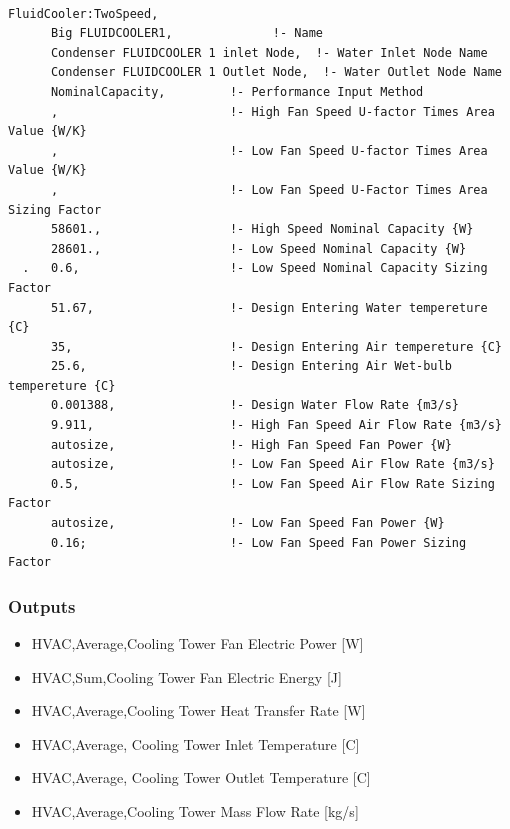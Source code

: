 \begin{lstlisting}

FluidCooler:TwoSpeed,
      Big FLUIDCOOLER1,              !- Name
      Condenser FLUIDCOOLER 1 inlet Node,  !- Water Inlet Node Name
      Condenser FLUIDCOOLER 1 Outlet Node,  !- Water Outlet Node Name
      NominalCapacity,         !- Performance Input Method
      ,                        !- High Fan Speed U-factor Times Area Value {W/K}
      ,                        !- Low Fan Speed U-factor Times Area Value {W/K}
      ,                        !- Low Fan Speed U-Factor Times Area Sizing Factor
      58601.,                  !- High Speed Nominal Capacity {W}
      28601.,                  !- Low Speed Nominal Capacity {W}
  .   0.6,                     !- Low Speed Nominal Capacity Sizing Factor
      51.67,                   !- Design Entering Water tempereture {C}
      35,                      !- Design Entering Air tempereture {C}
      25.6,                    !- Design Entering Air Wet-bulb tempereture {C}
      0.001388,                !- Design Water Flow Rate {m3/s}
      9.911,                   !- High Fan Speed Air Flow Rate {m3/s}
      autosize,                !- High Fan Speed Fan Power {W}
      autosize,                !- Low Fan Speed Air Flow Rate {m3/s}
      0.5,                     !- Low Fan Speed Air Flow Rate Sizing Factor
      autosize,                !- Low Fan Speed Fan Power {W}
      0.16;                    !- Low Fan Speed Fan Power Sizing Factor
\end{lstlisting}

\subsubsection{Outputs}\label{outputs-9-000}

\begin{itemize}
\item
  HVAC,Average,Cooling Tower Fan Electric Power {[}W{]}
\item
  HVAC,Sum,Cooling Tower Fan Electric Energy {[}J{]}
\item
  HVAC,Average,Cooling Tower Heat Transfer Rate {[}W{]}
\item
  HVAC,Average, Cooling Tower Inlet Temperature {[}C{]}
\item
  HVAC,Average, Cooling Tower Outlet Temperature {[}C{]}
\item
  HVAC,Average,Cooling Tower Mass Flow Rate {[}kg/s{]}
\end{itemize}

